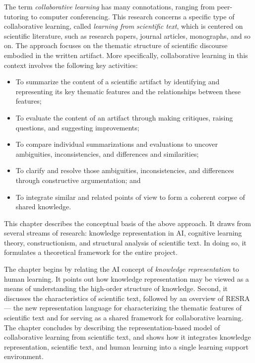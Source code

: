 The term {\it collaborative learning\/} has many connotations, ranging from
peer-tutoring to computer conferencing. This research concerns a specific
type of collaborative learning, called {\it learning from scientific
text\/}, which is centered on scientific literature, such as research
papers, journal articles, monographs, and so on. The approach focuses on
the thematic structure of scientific discourse embodied in the written
artifact. More specifically, collaborative learning in this context
involves the following key activities:

\begin{itemize}
\item To summarize the content of a scientific artifact by identifying
  and representing its key thematic features and the relationships
  between these features;
  
\item To evaluate the content of an artifact through making critiques,
  raising questions, and suggesting improvements;
  
\item To compare individual summarizations and evaluations to uncover
  ambiguities, inconsistencies, and differences and similarities;
  
\item To clarify and resolve those ambiguities, inconsistencies, and
  differences through constructive argumentation; and
  
\item To integrate similar and related points of view to form a coherent
  corpse of shared knowledge.
\end{itemize}

This chapter describes the conceptual basis of the above approach. It draws
from several streams of research: knowledge representation in AI, cognitive
learning theory, constructionism, and structural analysis of scientific
text. In doing so, it formulates a theoretical framework for the entire
project.

The chapter begins by relating the AI concept of {\it knowledge
representation\/} to human learning. It points out how knowledge
representation may be viewed as a means of understanding the high-order
structure of knowledge. Second, it discusses the characteristics of
scientific text, followed by an overview of RESRA --- the new
representation language for characterizing the thematic features of
scientific text and for serving as a shared framework for collaborative
learning. The chapter concludes by describing the representation-based
model of collaborative learning from scientific text, and shows how it
integrates knowledge representation, scientific text, and human learning
into a single learning support environment.



